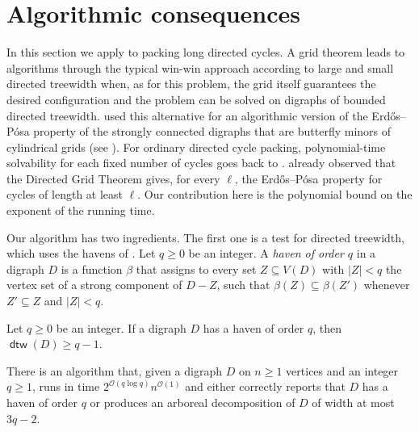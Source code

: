 \documentclass[fontsize=12pt,leading=14pt]{fullpaper}
\DeclareMathOperator{\dtw}{\mathsf{dtw}}
\begin{document}
\section{Algorithmic consequences}\label{sec:algorithms}

In this section we apply  to packing long directed cycles.
A grid theorem leads to algorithms through the typical win-win approach according to large and small directed treewidth when, as for this problem, the grid itself guarantees the desired configuration and the problem can be solved on digraphs of bounded directed treewidth.
\textcite[proof of Theorem~4.3]{AKKW16} used this alternative for an algorithmic version of the Erd\H{o}s--P\'osa property of the strongly connected digraphs that are butterfly minors of cylindrical grids (see ).
For ordinary directed cycle packing, polynomial-time solvability for each fixed number of cycles goes back to \textcite[Section~5]{ReedRST96}.
\textcite[Section~1]{KawarabayashiK15} already observed that the Directed Grid Theorem gives, for every $\ell$, the Erd\H{o}s--P\'osa property for cycles of length at least $\ell$.
Our contribution here is the polynomial bound on the exponent of the running time.

Our algorithm has two ingredients.
The first one is a test for directed treewidth, which uses the havens of \textcite{Johnson2001}.
Let $q\ge0$ be an integer.
A \emph{haven of order $q$} in a digraph $D$ is a function $\beta$ that assigns to every set $Z\subseteq V(D)$ with $|Z|<q$ the vertex set of a strong component of $D-Z$, such that $\beta(Z)\subseteq\beta(Z')$ whenever $Z'\subseteq Z$ and $|Z|<q$.

\begin{proposition}\label{prop:haven-dtw}
  Let $q\ge0$ be an integer.
  If a digraph $D$ has a haven of order $q$, then $\dtw(D)\ge q-1$.
\end{proposition}

\begin{proposition}\label{prop:clms-width-test}
  There is an algorithm that, given a digraph $D$ on $n\ge1$ vertices and an integer $q\ge1$, runs in time $2^{\mathcal{O}(q\log q)}n^{\mathcal{O}(1)}$ and either correctly reports that $D$ has a haven of order $q$ or produces an arboreal decomposition of $D$ of width at most $3q-2$.
\end{proposition}
\end{document}

